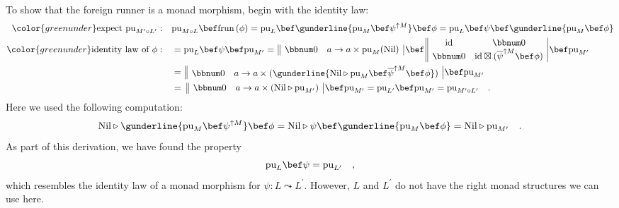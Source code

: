 To show that the foreign runner is a monad morphism, begin with the
identity law:
\begin{align*}
{\color{greenunder}\text{expect }\text{pu}_{M^{\prime}\circ L^{\prime}}:}\quad & \text{pu}_{M\circ L}\bef\text{frun}\,(\phi)=\text{pu}_{L}\bef\gunderline{\text{pu}_{M}\bef\psi^{\uparrow M}}\bef\phi=\text{pu}_{L}\bef\psi\bef\gunderline{\text{pu}_{M}\bef\phi}\\
{\color{greenunder}\text{identity law of }\phi:}\quad & =\text{pu}_{L}\bef\psi\bef\text{pu}_{M^{\prime}}=\,\begin{array}{||cc|}
\bbnum 0 & a\rightarrow a\times\text{pu}_{M}(\text{Nil})\end{array}\,\bef\,\begin{array}{||cc|}
\text{id} & \bbnum 0\\
\bbnum 0 & \text{id}\boxtimes(\overline{\psi}^{\uparrow M}\bef\phi)
\end{array}\,\bef\text{pu}_{M^{\prime}}\\
 & =\,\begin{array}{||cc|}
\bbnum 0 & a\rightarrow a\times(\gunderline{\text{Nil}\triangleright\text{pu}_{M}\bef\overline{\psi}^{\uparrow M}\bef\phi})\end{array}\,\bef\text{pu}_{M^{\prime}}\\
 & =\,\,\begin{array}{||cc|}
\bbnum 0 & a\rightarrow a\times(\text{Nil}\triangleright\text{pu}_{M^{\prime}})\end{array}\,\bef\text{pu}_{M^{\prime}}=\text{pu}_{L^{\prime}}\bef\text{pu}_{M^{\prime}}=\text{pu}_{M^{\prime}\circ L^{\prime}}\quad.
\end{align*}
Here we used the following computation:
\[
\text{Nil}\triangleright\gunderline{\text{pu}_{M}\bef\psi^{\uparrow M}}\bef\phi=\text{Nil}\triangleright\psi\bef\gunderline{\text{pu}_{M}\bef\phi}=\text{Nil}\triangleright\text{pu}_{M^{\prime}}\quad.
\]
As part of this derivation, we have found the property
\begin{equation}
\text{pu}_{L}\bef\psi=\text{pu}_{L^{\prime}}\quad,\label{eq:puL-psi-derivation1}
\end{equation}
which resembles the identity law of a monad morphism for $\psi:L\leadsto L^{\prime}$.
However, $L$ and $L^{\prime}$ do not have the right monad structures
we can use here.

